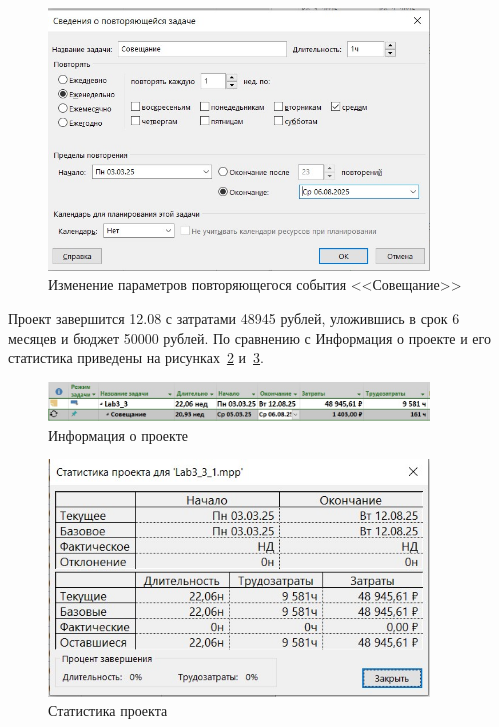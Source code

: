 \begin{figure}[H]
	\centering
	\includegraphics[width=0.9\textwidth]{img/task3/screen3.jpg}
	\caption{Изменение параметров повторяющегося события <<Совещание>>}
	\label{fig:screen3_3}
\end{figure}

Проект завершится 12.08 с затратами 48945 рублей, уложившись в срок 6 месяцев и бюджет 50000 рублей.
По сравнению с 
Информация о проекте и его статистика приведены на рисунках~\ref{fig:screen3_4} и~\ref{fig:screen3_9}.

\begin{figure}[H]
	\centering
	\includegraphics[width=0.9\textwidth]{img/task3/screen4.jpg}
	\caption{Информация о проекте}
	\label{fig:screen3_4}
\end{figure}

\begin{figure}[H]
	\centering
	\includegraphics[width=0.9\textwidth]{img/task3/screen9.jpg}
	\caption{Статистика проекта}
	\label{fig:screen3_9}
\end{figure}

